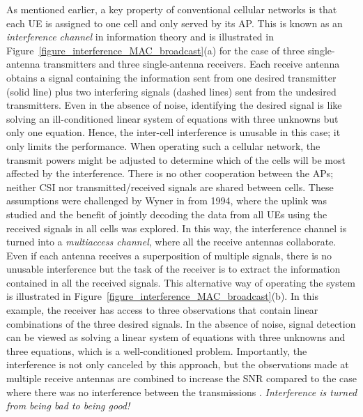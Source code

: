\enlargethispage{\baselineskip} 

As mentioned earlier, a key property of conventional cellular networks is that each \gls{UE} is assigned to one cell and only served by its \gls{AP}. This is known as an \emph{interference channel} in information theory and is illustrated in Figure~\ref{figure_interference_MAC_broadcast}(a) for the case of three single-antenna transmitters and three single-antenna receivers. Each receive antenna obtains  a signal containing the information sent from one desired transmitter (solid line) plus two interfering signals (dashed lines) sent from the undesired transmitters. 
Even in the absence of noise, identifying the desired signal is like solving an ill-conditioned linear system of equations with three unknowns but only one equation.
Hence, the inter-cell interference is unusable in this case; it only limits the performance.
When operating such a cellular network, the transmit powers might be adjusted to determine which of the cells will be most affected by the interference. There is no other cooperation between the \glspl{AP}; neither \gls{CSI} nor transmitted/received signals are shared between cells.
These assumptions were challenged by Wyner in \cite{Wyner1994a} from 1994, where the uplink was studied and the benefit of jointly decoding the data from all \glspl{UE} using the received signals in all cells was explored. In this way, the interference channel is turned into a \emph{multiaccess channel}, where all the receive antennas collaborate. Even if each antenna receives a superposition of multiple signals, there is no unusable interference but the task of the receiver is to extract the information contained in all the received signals.
This alternative way of operating the system is illustrated in Figure~\ref{figure_interference_MAC_broadcast}(b). In this example, the receiver has access to three observations that contain linear combinations of the three desired signals. 
In the absence of noise, signal detection can be viewed as solving a linear system of equations with three unknowns and three equations, which is a well-conditioned problem.
Importantly, the interference is not only canceled by this approach, but the observations made at multiple receive antennas are combined to increase the \gls{SNR} compared to the case where there was no interference between the transmissions \cite{Gesbert2010a}. \emph{Interference is turned from being bad to being good!}



